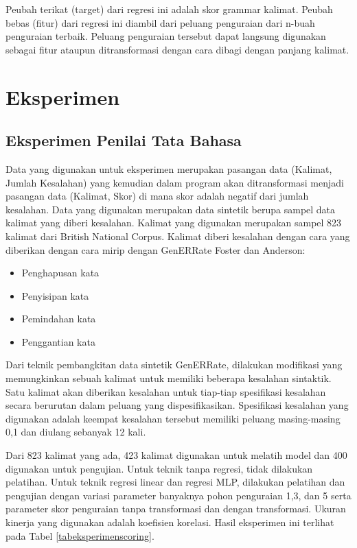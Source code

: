 \documentclass[conference]{IEEEtran}
\begin{document}
Peubah terikat (target) dari regresi ini adalah skor grammar kalimat. Peubah bebas (fitur) dari regresi ini diambil dari peluang penguraian dari n-buah penguraian terbaik. Peluang penguraian tersebut dapat langsung digunakan sebagai fitur ataupun ditransformasi dengan cara dibagi dengan panjang kalimat.

\section{Eksperimen}

\subsection{Eksperimen Penilai Tata Bahasa}

Data yang digunakan untuk eksperimen merupakan pasangan data (Kalimat, Jumlah Kesalahan) yang kemudian dalam program akan ditransformasi menjadi pasangan data (Kalimat, Skor) di mana skor adalah negatif dari jumlah kesalahan. 
Data yang digunakan merupakan data sintetik berupa sampel data kalimat yang diberi kesalahan. Kalimat yang digunakan merupakan sampel 823 kalimat dari British National Corpus\cite{b9}. Kalimat diberi kesalahan dengan cara yang diberikan dengan cara mirip dengan GenERRate Foster dan Anderson\cite{b10}:
\begin{itemize}
\item Penghapusan kata
\item Penyisipan kata
\item Pemindahan kata
\item Penggantian kata
\end{itemize}
Dari teknik pembangkitan data sintetik GenERRate\cite{b10}, dilakukan modifikasi yang memungkinkan sebuah kalimat untuk memiliki beberapa kesalahan sintaktik. Satu kalimat akan diberikan kesalahan untuk tiap-tiap spesifikasi kesalahan secara berurutan dalam peluang yang dispesifikasikan. Spesifikasi kesalahan yang digunakan adalah keempat kesalahan tersebut memiliki peluang masing-masing 0,1 dan diulang sebanyak 12 kali.

Dari 823 kalimat yang ada, 423 kalimat digunakan untuk melatih model dan 400 digunakan untuk pengujian. Untuk teknik tanpa regresi, tidak dilakukan pelatihan. Untuk teknik regresi linear dan regresi MLP, dilakukan pelatihan dan pengujian dengan variasi parameter banyaknya pohon penguraian 1,3, dan 5 serta parameter skor penguraian tanpa transformasi dan dengan transformasi. Ukuran kinerja yang digunakan adalah koefisien korelasi. Hasil eksperimen ini terlihat pada Tabel \ref{tabeksperimenscoring}.
\end{document}
